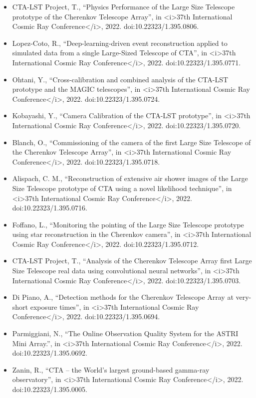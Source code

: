 \begin{itemize}
\item CTA-LST Project, T., “Physics Performance of the Large Size Telescope prototype of the Cherenkov Telescope Array”, in <i>37th International Cosmic Ray Conference</i>, 2022. doi:10.22323/1.395.0806.
\item Lopez-Coto, R., “Deep-learning-driven event reconstruction applied to simulated data from a single Large-Sized Telescope of CTA”, in <i>37th International Cosmic Ray Conference</i>, 2022. doi:10.22323/1.395.0771.
\item Ohtani, Y., “Cross-calibration and combined analysis of the CTA-LST prototype and the MAGIC telescopes”, in <i>37th International Cosmic Ray Conference</i>, 2022. doi:10.22323/1.395.0724.
\item Kobayashi, Y., “Camera Calibration of the CTA-LST prototype”, in <i>37th International Cosmic Ray Conference</i>, 2022. doi:10.22323/1.395.0720.
\item Blanch, O., “Commissioning of the camera of the first Large Size Telescope of the Cherenkov Telescope Array”, in <i>37th International Cosmic Ray Conference</i>, 2022. doi:10.22323/1.395.0718.
\item Alispach, C. M., “Reconstruction of extensive air shower images of the Large Size Telescope prototype of CTA using a novel likelihood technique”, in <i>37th International Cosmic Ray Conference</i>, 2022. doi:10.22323/1.395.0716.
\item Foffano, L., “Monitoring the pointing of the Large Size Telescope prototype using star reconstruction in the Cherenkov camera”, in <i>37th International Cosmic Ray Conference</i>, 2022. doi:10.22323/1.395.0712.
\item CTA-LST Project, T., “Analysis of the Cherenkov Telescope Array first Large Size Telescope real data using convolutional neural networks”, in <i>37th International Cosmic Ray Conference</i>, 2022. doi:10.22323/1.395.0703.
\item Di Piano, A., “Detection methods for the Cherenkov Telescope Array at very-short exposure times”, in <i>37th International Cosmic Ray Conference</i>, 2022. doi:10.22323/1.395.0694.
\item Parmiggiani, N., “The Online Observation Quality System for the ASTRI Mini Array.”, in <i>37th International Cosmic Ray Conference</i>, 2022. doi:10.22323/1.395.0692.
\item Zanin, R., “CTA – the World's largest ground-based gamma-ray observatory”, in <i>37th International Cosmic Ray Conference</i>, 2022. doi:10.22323/1.395.0005.

\end{itemize}
